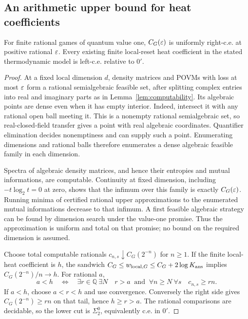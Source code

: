 \subsection{An arithmetic upper bound for heat coefficients}\label{sec:heat-arithmetic}
\begin{proposition}\label{prop:heat-upper-class}
For finite rational games of quantum value one, $C_G(\varepsilon)$ is uniformly right-c.e. at positive rational $\varepsilon$. Every existing finite local-reset heat coefficient in the stated thermodynamic model is left-c.e. relative to $0'$.
\end{proposition}
\begin{proof}
At a fixed local dimension $d$, density matrices and POVMs with loss at most $\varepsilon$ form a rational semialgebraic feasible set, after splitting complex entries into real and imaginary parts as in Lemma~\ref{lem:computability}. Its algebraic points are dense even when it has empty interior. Indeed, intersect it with any rational open ball meeting it. This is a nonempty rational semialgebraic set, so real-closed-field transfer gives a point with real algebraic coordinates. Quantifier elimination decides nonemptiness and can supply such a point. Enumerating dimensions and rational balls therefore enumerates a dense algebraic feasible family in each dimension.

Spectra of algebraic density matrices, and hence their entropies and mutual informations, are computable. Continuity at fixed dimension, including $-t\log_2t=0$ at zero, shows that the infimum over this family is exactly $C_G(\varepsilon)$. Running minima of certified rational upper approximations to the enumerated mutual informations decrease to that infimum. A first feasible algebraic strategy can be found by dimension search under the value-one promise. Thus the approximation is uniform and total on that promise; no bound on the required dimension is assumed.

Choose total computable rationals $c_{n,s}\downarrow C_G(2^{-n})$ for $n\ge1$. If the finite local-heat coefficient is $h$, the sandwich $C_G\le w_{{\rm local},G}\le C_G+2\log K_{\rm ans}$ implies $C_G(2^{-n})/n\to h$. For rational $a$,
\begin{equation}\label{eq:heat-lower-cut}
 a<h\quad\Longleftrightarrow\quad
 \exists r\in\mathbb Q\ \exists N\quad
 r>a\ \text{ and }\ \forall n\ge N\ \forall s\quad c_{n,s}\ge rn.
\end{equation}
If $a<h$, choose $a<r<h$ and use convergence. Conversely the right side gives $C_G(2^{-n})\ge rn$ on that tail, hence $h\ge r>a$. The rational comparisons are decidable, so the lower cut is $\Sigma^0_2$, equivalently c.e. in $0'$.
\end{proof}

